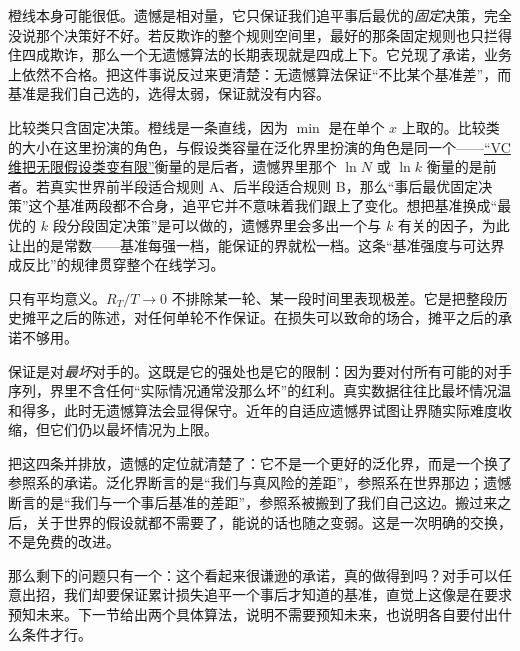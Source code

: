 橙线本身可能很低。遗憾是相对量，它只保证我们追平事后最优的\emph{固定}决策，完全没说那个决策好不好。若反欺诈的整个规则空间里，最好的那条固定规则也只拦得住四成欺诈，那么一个无遗憾算法的长期表现就是四成上下。它兑现了承诺，业务上依然不合格。把这件事说反过来更清楚：无遗憾算法保证``不比某个基准差''，而基准是我们自己选的，选得太弱，保证就没有内容。

比较类只含固定决策。橙线是一条直线，因为 \(\min\) 是在单个 \(x\) 上取的。比较类的大小在这里扮演的角色，与假设类容量在泛化界里扮演的角色是同一个——\hyperref[sec:13-Machine-Learning/10-Learning-Theory/03]{``VC 维把无限假设类变有限''}衡量的是后者，遗憾界里那个 \(\ln N\) 或 \(\ln k\) 衡量的是前者。若真实世界前半段适合规则 A、后半段适合规则 B，那么``事后最优固定决策''这个基准两段都不合身，追平它并不意味着我们跟上了变化。想把基准换成``最优的 \(k\) 段分段固定决策''是可以做的，遗憾界里会多出一个与 \(k\) 有关的因子，为此让出的是常数——基准每强一档，能保证的界就松一档。这条``基准强度与可达界成反比''的规律贯穿整个在线学习。

只有平均意义。\(R_T/T\to0\) 不排除某一轮、某一段时间里表现极差。它是把整段历史摊平之后的陈述，对任何单轮不作保证。在损失可以致命的场合，摊平之后的承诺不够用。

保证是对\emph{最坏}对手的。这既是它的强处也是它的限制：因为要对付所有可能的对手序列，界里不含任何``实际情况通常没那么坏''的红利。真实数据往往比最坏情况温和得多，此时无遗憾算法会显得保守。近年的自适应遗憾界试图让界随实际难度收缩，但它们仍以最坏情况为上限。

把这四条并排放，遗憾的定位就清楚了：它不是一个更好的泛化界，而是一个换了参照系的承诺。泛化界断言的是``我们与真风险的差距''，参照系在世界那边；遗憾断言的是``我们与一个事后基准的差距''，参照系被搬到了我们自己这边。搬过来之后，关于世界的假设就都不需要了，能说的话也随之变弱。这是一次明确的交换，不是免费的改进。

那么剩下的问题只有一个：这个看起来很谦逊的承诺，真的做得到吗？对手可以任意出招，我们却要保证累计损失追平一个事后才知道的基准，直觉上这像是在要求预知未来。下一节给出两个具体算法，说明不需要预知未来，也说明各自要付出什么条件才行。
